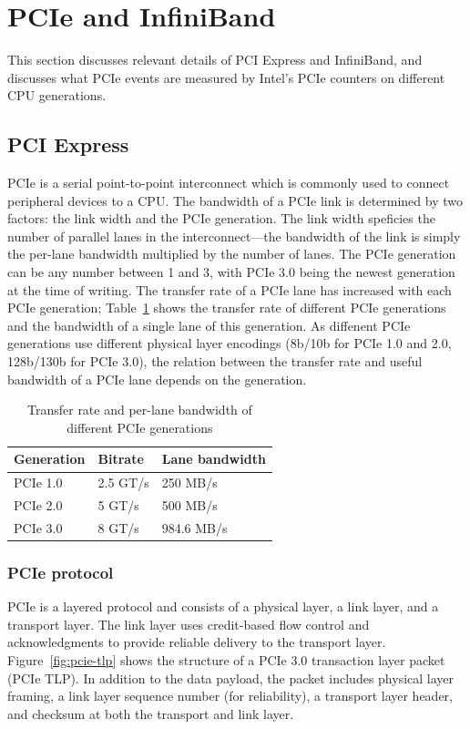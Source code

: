 \section{PCIe and InfiniBand}
\label{sec:pcie}

This section discusses relevant details of PCI Express and InfiniBand, and
discusses what PCIe events are measured by Intel's PCIe counters on different
CPU generations.

\subsection{PCI Express}
PCIe is a serial point-to-point interconnect which is commonly used to connect
peripheral devices to a CPU. The bandwidth of a PCIe link is determined by two
factors: the link width and the PCIe generation. The link width speficies the
number of parallel lanes in the interconnect---the bandwidth of the link is
simply the per-lane bandwidth multiplied by the number of lanes. The PCIe
generation can be any number between 1 and 3, with PCIe 3.0 being the newest
generation at the time of writing. The transfer rate of a PCIe lane has
increased with each PCIe generation; Table~\ref{table:pcie} shows the transfer
rate of different PCIe generations and the bandwidth of a single lane of this
generation. As diffenent PCIe generations use different physical layer encodings
(8b/10b for PCIe 1.0 and 2.0, 128b/130b for PCIe 3.0), the relation between the
transfer rate and useful bandwidth of a PCIe lane depends on the generation. 

\begin{table}
\begin{center}
    \begin{tabular}{p{2.5cm} p{1.5cm} p{2.5cm}}
	\textbf{Generation} & \textbf{Bitrate} & \textbf{Lane bandwidth}\\
    \hline
	PCIe 1.0 & 2.5 GT/s & 250 MB/s \\
	PCIe 2.0 & 5 GT/s & 500 MB/s \\
	PCIe 3.0 & 8 GT/s & 984.6 MB/s \\
    \end{tabular}
\caption{Transfer rate and per-lane bandwidth of different PCIe generations}
\label{table:pcie}
\end{center}
\end{table}

\subsubsection{PCIe protocol}
PCIe is a layered protocol and consists of a physical layer, a link layer,
and a transport layer. The link layer uses credit-based flow control and
acknowledgments to provide reliable delivery to the transport layer.
Figure~\ref{fig:pcie-tlp} shows the structure of a PCIe 3.0 transaction layer
packet (PCIe TLP). In addition to the data payload, the packet includes physical
layer framing, a link layer sequence number (for reliability), a transport layer
header, and checksum at both the transport and link layer.

